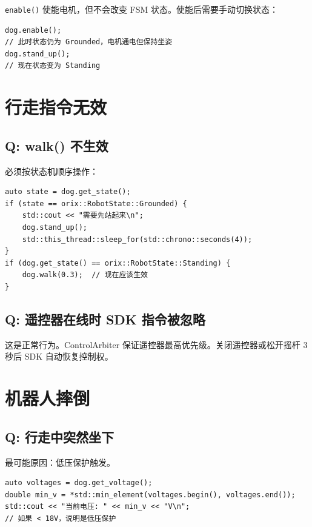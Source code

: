 \documentclass[a4paper,11pt,openany]{book}
\begin{document}
\texttt{enable()} 使能电机，但不会改变 FSM 状态。使能后需要手动切换状态：

\begin{lstlisting}[style=cpp]
dog.enable();
// 此时状态仍为 Grounded，电机通电但保持坐姿
dog.stand_up();
// 现在状态变为 Standing
\end{lstlisting}

\section{行走指令无效}

\subsection{Q: walk() 不生效}

必须按状态机顺序操作：

\begin{lstlisting}[style=cpp]
auto state = dog.get_state();
if (state == orix::RobotState::Grounded) {
    std::cout << "需要先站起来\n";
    dog.stand_up();
    std::this_thread::sleep_for(std::chrono::seconds(4));
}
if (dog.get_state() == orix::RobotState::Standing) {
    dog.walk(0.3);  // 现在应该生效
}
\end{lstlisting}

\subsection{Q: 遥控器在线时 SDK 指令被忽略}

这是正常行为。ControlArbiter 保证遥控器最高优先级。关闭遥控器或松开摇杆 3 秒后 SDK 自动恢复控制权。

\section{机器人摔倒}

\subsection{Q: 行走中突然坐下}

最可能原因：低压保护触发。

\begin{lstlisting}[style=cpp]
auto voltages = dog.get_voltage();
double min_v = *std::min_element(voltages.begin(), voltages.end());
std::cout << "当前电压: " << min_v << "V\n";
// 如果 < 18V，说明是低压保护
\end{lstlisting}
\end{document}
